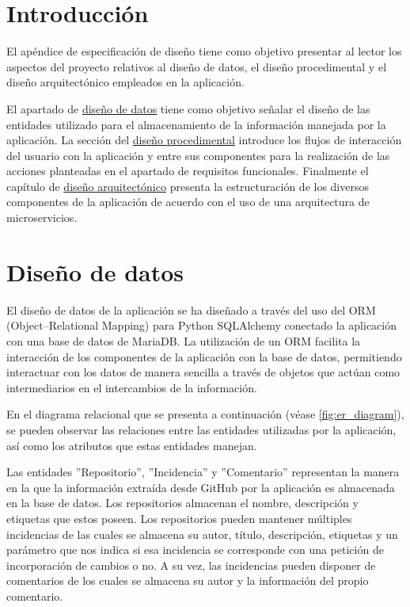 
\section{Introducción}

El apéndice de especificación de diseño tiene como objetivo presentar al lector los aspectos del proyecto relativos al diseño de datos, el diseño procedimental y el diseño arquitectónico empleados en la aplicación.

El apartado de \hyperref[sec:datadesign]{diseño de datos} tiene como objetivo señalar el diseño de las entidades utilizado para el almacenamiento de la información manejada por la aplicación. La sección del \hyperref[sec:proceduraldesign]{diseño procedimental} introduce los flujos de interacción del usuario con la aplicación y entre sus componentes para la realización de las acciones planteadas en el apartado de requisitos funcionales. Finalmente el capítulo de \hyperref[sec:archdesign]{diseño arquitectónico} presenta la estructuración de los diversos componentes de la aplicación de acuerdo con el uso de una arquitectura de microservicios.

\section{Diseño de datos} \label{sec:datadesign}

El diseño de datos de la aplicación se ha diseñado a través del uso del ORM (Object–Relational Mapping) para Python SQLAlchemy conectado la aplicación con una base de datos de MariaDB. La utilización de un ORM facilita la interacción de los componentes de la aplicación con la base de datos, permitiendo interactuar con los datos de manera sencilla a través de objetos que actúan como intermediarios en el intercambios de la información.

En el diagrama relacional que se presenta a continuación (véase \autoref{fig:er_diagram}), se pueden observar las relaciones entre las entidades utilizadas por la aplicación, así como los atributos que estas entidades manejan. 

Las entidades ''Repositorio'', ''Incidencia'' y ''Comentario'' representan la manera en la que la información extraída desde GitHub por la aplicación es almacenada en la base de datos. Los repositorios almacenan el nombre, descripción y etiquetas que estos poseen. Los repositorios pueden mantener múltiples incidencias de las cuales se almacena su autor, título, descripción, etiquetas y un parámetro que nos indica si esa incidencia se corresponde con una petición de incorporación de cambios o no. A su vez, las incidencias pueden disponer de comentarios de los cuales se almacena su autor y la información del propio comentario.

